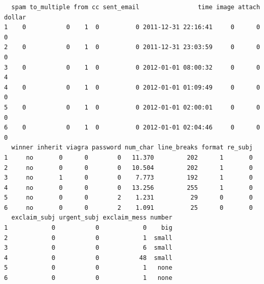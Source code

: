 \documentclass[
  letterpaper,
  DIV=11,
  numbers=noendperiod,
  oneside]{scrreprt}
\begin{document}
\begin{verbatim}
  spam to_multiple from cc sent_email                time image attach dollar
1    0           0    1  0          0 2011-12-31 22:16:41     0      0      0
2    0           0    1  0          0 2011-12-31 23:03:59     0      0      0
3    0           0    1  0          0 2012-01-01 08:00:32     0      0      4
4    0           0    1  0          0 2012-01-01 01:09:49     0      0      0
5    0           0    1  0          0 2012-01-01 02:00:01     0      0      0
6    0           0    1  0          0 2012-01-01 02:04:46     0      0      0
  winner inherit viagra password num_char line_breaks format re_subj
1     no       0      0        0   11.370         202      1       0
2     no       0      0        0   10.504         202      1       0
3     no       1      0        0    7.773         192      1       0
4     no       0      0        0   13.256         255      1       0
5     no       0      0        2    1.231          29      0       0
6     no       0      0        2    1.091          25      0       0
  exclaim_subj urgent_subj exclaim_mess number
1            0           0            0    big
2            0           0            1  small
3            0           0            6  small
4            0           0           48  small
5            0           0            1   none
6            0           0            1   none
\end{verbatim}
\end{document}

